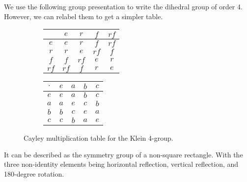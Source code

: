   \begin{example}
    We use the following group presentation to write the dihedral group of order 4. However, we can relabel them to get a simpler table. 

    \begin{figure}[H]
      \centering
      \begin{subfigure}[b]{0.48\textwidth}
        \centering
        \begin{tabular}{|c|c|c|c|c|}
          \hline
          & $e$ & $r$ & $f$ & $rf$ \\
          \hline
          $e$ & $e$ & $r$ & $f$ & $rf$ \\
          \hline
          $r$ & $r$ & $e$ & $rf$ & $f$ \\
          \hline
          $f$ & $f$ & $rf$ & $e$ & $r$ \\
          \hline
          $rf$ & $rf$ & $f$ & $r$ & $e$ \\
          \hline
        \end{tabular}
      \end{subfigure}
      \hfill 
      \begin{subfigure}[b]{0.48\textwidth}
        \centering 
        \begin{tabular}{c|cccc}
          \hline
          $\cdot$ & $e$ & $a$ & $b$ & $c$ \\
          \hline
          $e$ & $e$ & $a$ & $b$ & $c$ \\
          $a$ & $a$ & $e$ & $c$ & $b$ \\
          $b$ & $b$ & $c$ & $e$ & $a$ \\
          $c$ & $c$ & $b$ & $a$ & $e$ \\
          \hline
        \end{tabular}
      \end{subfigure}
      \caption{Cayley multiplication table for the Klein 4-group.}
      \label{fig:dihedral_order4}
    \end{figure}

    It can be described as the symmetry group of a non-square rectangle. With the three non-identity elements being horizontal reflection, vertical reflection, and 180-degree rotation. 
  \end{example}


